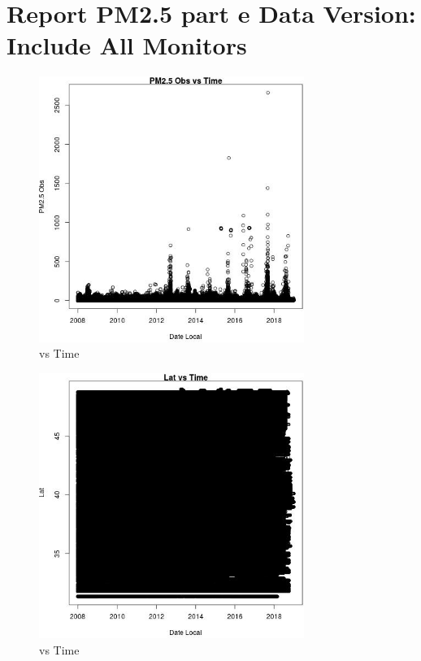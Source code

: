 
\section{Report PM2.5 part e Data Version: Include All Monitors} 
 

\begin{figure} 
\centering  
\includegraphics[width=0.77\textwidth]{Code_Outputs/Report_PM25_Step4_part_e_de_duplicated_aves_ML_input_PM25_ObsvDate_Local.jpg} 
\caption{\label{fig:Report_PM25_Step4_part_e_de_duplicated_aves_ML_inputPM25_ObsvDate_Local}vs Time} 
\end{figure} 
 

\begin{figure} 
\centering  
\includegraphics[width=0.77\textwidth]{Code_Outputs/Report_PM25_Step4_part_e_de_duplicated_aves_ML_input_LatvDate_Local.jpg} 
\caption{\label{fig:Report_PM25_Step4_part_e_de_duplicated_aves_ML_inputLatvDate_Local}vs Time} 
\end{figure} 
 

